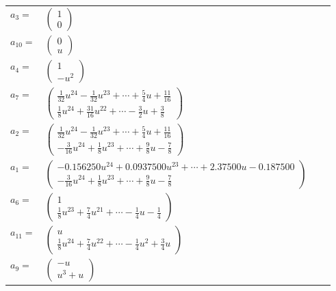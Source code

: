 \documentclass[1p]{elsarticle_modified}
\theoremstyle{definition}
\begin{document}
\begin{tabular}{m{7pt} m{180pt} m{7pt} m{180pt} }
\flushright $a_{3}=$&$\begin{pmatrix}1\\0\end{pmatrix}$ \\
\flushright $a_{10}=$&$\begin{pmatrix}0\\u\end{pmatrix}$ \\
\flushright $a_{4}=$&$\begin{pmatrix}1\\- u^2\end{pmatrix}$ \\
\flushright $a_{7}=$&$\begin{pmatrix}\frac{1}{32} u^{24}-\frac{1}{32} u^{23}+\cdots+\frac{5}{4} u+\frac{11}{16}\\\frac{1}{8} u^{24}+\frac{31}{16} u^{22}+\cdots-\frac{3}{2} u+\frac{3}{8}\end{pmatrix}$ \\
\flushright $a_{2}=$&$\begin{pmatrix}\frac{1}{32} u^{24}-\frac{1}{32} u^{23}+\cdots+\frac{5}{4} u+\frac{11}{16}\\-\frac{3}{16} u^{24}+\frac{1}{8} u^{23}+\cdots+\frac{9}{8} u-\frac{7}{8}\end{pmatrix}$ \\
\flushright $a_{1}=$&$\begin{pmatrix}-0.156250 u^{24}+0.0937500 u^{23}+\cdots+2.37500 u-0.187500\\-\frac{3}{16} u^{24}+\frac{1}{8} u^{23}+\cdots+\frac{9}{8} u-\frac{7}{8}\end{pmatrix}$ \\
\flushright $a_{6}=$&$\begin{pmatrix}1\\\frac{1}{8} u^{23}+\frac{7}{4} u^{21}+\cdots-\frac{1}{4} u-\frac{1}{4}\end{pmatrix}$ \\
\flushright $a_{11}=$&$\begin{pmatrix}u\\\frac{1}{8} u^{24}+\frac{7}{4} u^{22}+\cdots-\frac{1}{4} u^2+\frac{3}{4} u\end{pmatrix}$ \\
\flushright $a_{9}=$&$\begin{pmatrix}- u\\u^3+u\end{pmatrix}$ \\

\end{tabular}
\end{document}
